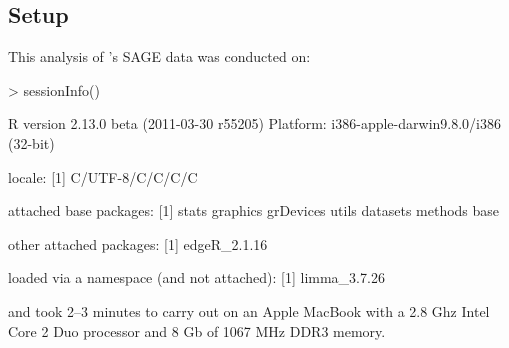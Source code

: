 \subsection{Setup}
This analysis of \citet{Zhang:1997p13}'s SAGE data was conducted on:
\begin{Schunk}
\begin{Sinput}
> sessionInfo()
\end{Sinput}
\begin{Soutput}
R version 2.13.0 beta (2011-03-30 r55205)
Platform: i386-apple-darwin9.8.0/i386 (32-bit)

locale:
[1] C/UTF-8/C/C/C/C

attached base packages:
[1] stats     graphics  grDevices utils     datasets  methods   base     

other attached packages:
[1] edgeR_2.1.16

loaded via a namespace (and not attached):
[1] limma_3.7.26
\end{Soutput}
\end{Schunk}
and took 2--3 minutes to carry out on an Apple MacBook with a 2.8
Ghz Intel Core 2 Duo processor and 8 Gb of 1067 MHz DDR3 memory.


